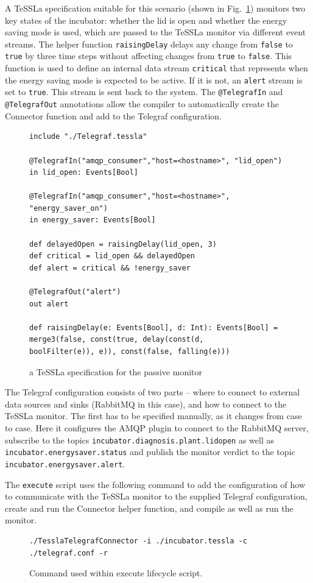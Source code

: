 A TeSSLa specification suitable for this scenario (shown in Fig.~\ref{fig:tessla_spec_passive}) monitors two key states of the incubator: whether the lid is open and whether the energy saving mode is used, which are passed to the TeSSLa monitor via different event streams.
The helper function \lstinline{raisingDelay} delays any change from \lstinline{false} to \lstinline{true} by three time steps without affecting changes from \lstinline{true} to \lstinline{false}.
This function is used to define an internal data stream \lstinline{critical} that represents when the energy saving mode is expected to be active.
If it is not, an \lstinline{alert} stream is set to \lstinline{true}.
This stream is sent back to the system.
The \lstinline{@TelegrafIn} and \lstinline{@TelegrafOut} annotations allow the compiler to automatically create the Connector function and add to the Telegraf configuration.
%
\begin{figure}[ht]
	\centering
	\begin{lstlisting}
include "./Telegraf.tessla"

@TelegrafIn("amqp_consumer","host=<hostname>", "lid_open")
in lid_open: Events[Bool]

@TelegrafIn("amqp_consumer","host=<hostname>",               "energy_saver_on")
in energy_saver: Events[Bool]

def delayedOpen = raisingDelay(lid_open, 3)
def critical = lid_open && delayedOpen
def alert = critical && !energy_saver

@TelegrafOut("alert")
out alert

def raisingDelay(e: Events[Bool], d: Int): Events[Bool] = merge3(false, const(true, delay(const(d,      boolFilter(e)), e)), const(false, falling(e)))
	\end{lstlisting}
	\caption{a TeSSLa specification for the passive monitor}
	\label{fig:tessla_spec_passive}
\end{figure}%
%
The Telegraf configuration consists of two parts -- where to connect to external data sources and sinks (RabbitMQ in this case), and how to connect to the TeSSLa monitor.
The first has to be specified manually, as it changes from case to case.
Here it configures the AMQP plugin to connect to the RabbitMQ server, subscribe to the topics \lstinline{incubator.diagnosis.plant.lidopen} as well as \lstinline{incubator.energysaver.status} and publish the monitor verdict to the topic \lstinline{incubator.energysaver.alert}.

The \texttt{execute} script uses the following command to add the configuration of how to communicate with the TeSSLa monitor to the supplied Telegraf configuration, create and run the Connector helper function, and compile as well as run the monitor.%
%
\begin{figure}[ht]
	\centering
	\begin{lstlisting}
./TesslaTelegrafConnector -i ./incubator.tessla -c ./telegraf.conf -r
	\end{lstlisting}
	\caption{Command used within execute lifecycle script.}
\end{figure}%

